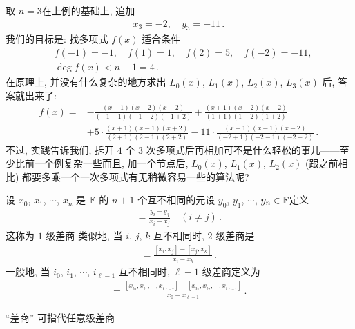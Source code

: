 \begin{example}
    取 $n = 3$\period 在上例的基础上, 追加
    \begin{align*}
        x_3 = -2, \quad y_3 = -11 \period
    \end{align*}
    我们的目标是: 找多项式 $f(x)$ 适合条件
    \begin{align*}
         & f(-1) = -1, \quad f(1) = 1, \quad f(2) = 5, \quad f(-2) = -11, \\
         & \deg f(x) < n + 1 = 4 \period
    \end{align*}
    在原理上, 并没有什么复杂的地方\period 求出 $L_0 (x)$, $L_1 (x)$, $L_2 (x)$, $L_3 (x)$ 后, 答案就出来了:
    \begin{align*}
        f(x)
        = {} & - \frac{(x-1)(x-2)(x+2)}{(-1-1)(-1-2)(-1+2)} + \frac{(x+1)(x-2)(x+2)}{(1+1)(1-2)(1+2)}                          \\
             & + 5 \cdot \frac{(x+1)(x-1)(x+2)}{(2+1)(2-1)(2+2)} - 11 \cdot \frac{(x+1)(x-1)(x-2)}{(-2+1)(-2-1)(-2-2)} \period
    \end{align*}
    不过, 实践告诉我们, 拆开 $4$ 个 $3$ 次多项式后再相加可不是什么轻松的事儿——至少比前一个例复杂一些\period 而且, 加一个节点后, $L_0 (x)$, $L_1 (x)$, $L_2 (x)$ (跟之前相比) 都要多乘一个一次多项式\period 有无稍微容易一些的算法呢?
\end{example}

\begin{definition}
    设 $x_0$, $x_1$, $\cdots$, $x_{n}$ 是 $\mathbb{F}$ 的 $n+1$ 个互不相同的元\period 设 $y_0$, $y_1$, $\cdots$, $y_{n} \in \mathbb{F}$\period 定义
    \begin{align*}
        [x_i, x_j] = \frac{y_i - y_j}{x_i - x_j} \quad (i \neq j)\period
    \end{align*}
    这称为 $1$ 级差商 \period 类似地, 当 $i$, $j$, $k$ 互不相同时, $2$ 级差商是
    \begin{align*}
        [x_i, x_j, x_k] = \frac{[x_i, x_j] - [x_j, x_k]}{x_i - x_k} \period
    \end{align*}
    一般地, 当 $i_0$, $i_1$, $\cdots$, $i_{\ell - 1}$ 互不相同时, $\ell - 1$ 级差商定义为
    \begin{align*}
        [x_{i_0}, x_{i_1}, \cdots, x_{i_{\ell - 1}}] = \frac{[x_{i_0}, x_{i_1}, \cdots, x_{i_{\ell - 2}}] - [x_{i_1}, x_{i_2}, \cdots, x_{i_{\ell - 1}}]}{x_0 - x_{\ell - 1}} \period
    \end{align*}

    ``差商'' 可指代任意级差商\period
\end{definition}

